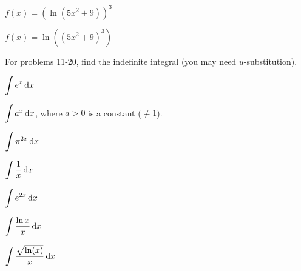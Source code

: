 \documentclass[10pt]{amsart}
\begin{document}
\vspace{2in}

\begin{thm}
  $\displaystyle{f(x)=\left(\ln(5x^2+9)\right)^3}$
\end{thm}

\newpage

\begin{thm}
  $\displaystyle{f(x)=\ln\left((5x^2+9)^3\right)}$
\end{thm}

\vspace{2in}

For problems 11-20, find the indefinite integral (you may need $u$-substitution).\\

\begin{thm}
  $\displaystyle{\int e^x\dif x}$
\end{thm}

\vspace{1in}

\begin{thm}
  $\displaystyle{\int a^x\dif x}$, where $a>0$ is a constant ($\neq 1$).
\end{thm}

\vspace{1in}

\begin{thm}
  $\displaystyle{\int\pi^{2x}\dif x}$
\end{thm}

\newpage

\begin{thm}
  $\displaystyle{\int\frac{1}{x}\dif x}$
\end{thm}

\vspace{1in}

\begin{thm}
  $\displaystyle{\int e^{2x}\dif x}$
  \end{thm}

\vspace{2in}

\begin{thm}
  $\displaystyle{\int\frac{\ln x}{x}\dif x}$
\end{thm}

\vspace{2in}

\begin{thm}
  $\displaystyle{\int\frac{\sqrt{\ln(x)}}{x}\dif x}$
\end{thm}
\end{document}
